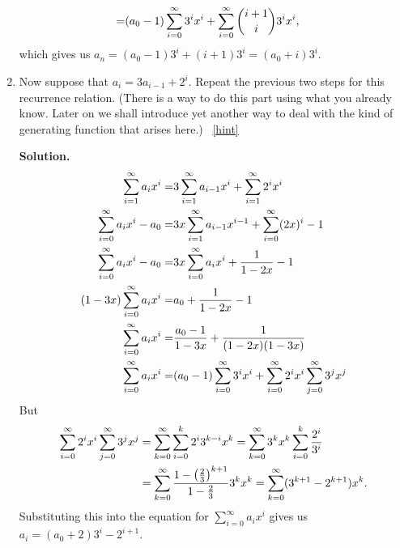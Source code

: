 \documentclass{book}
\begin{document}
\begin{activity}[]
\begin{enumerate}[font=\bfseries,label=(\alph*),ref=\alph*]
\begin{align*}
=& (a_0-1)\sum_{i=0}^\infty 3^ix^i +\sum_{i=0}^\infty \binom{i+1}{i}3^ix^i,
\end{align*}
which gives us \(a_n=(a_0-1) 3^i + (i+1)3^i=(a_0+i)3^i\).%
\item\label{task-249} \hypertarget{p-1406}{}%
Now suppose that \(a_i=3a_{i-1} + 2^i\).  Repeat the previous two steps for this recurrence relation.  (There is a way to do this part using what you already know.  Later on we shall introduce yet another way to deal with the kind of generating function that arises here.)%
~\hfill{\tiny\hyperlink{a-258.c}{[hint]}\hypertarget{q-258.c}{}}\par\smallskip%
\noindent\textbf{Solution.}\hypertarget{solution-196}{}\quad%
\hypertarget{p-1408}{}%
%
\begin{align*}
\sum_{i=1}^\infty a_ix^i =& 3\sum_{i=1}^\infty
a_{i-1}x^i +\sum_{i=1}^\infty 2^ix^i\\
\sum_{i=0}^\infty a_ix^i -a_0  =& 3x\sum_{i=1}^\infty a_{i-1}x^{i-1}
+\sum_{i=0}^\infty (2x)^i -1\\
\sum_{i=0}^\infty a_ix^i -a_0  =& 3x\sum_{i=0}^\infty a_ix^i +\frac{1}{1-2x} -1\\
(1-3x)\sum_{i=0}^\infty a_ix^i =& a_0 +\frac{1}{1-2x}-1\\
\sum_{i=0}^\infty a_ix^i =&  \frac{a_0-1}{1-3x}+\frac{1}{(1-2x)(1-3x)}\\
\sum_{i=0}^\infty a_ix^i =& (a_0-1)\sum_{i=0}^\infty 3^ix^i +\sum_{i=0}^\infty
2^ix^i\sum_{j=0}^\infty 3^jx^j
\end{align*}
But%
\begin{align*}
\sum_{i=0}^\infty
2^ix^i\sum_{j=0}^\infty 3^jx^j&=
\sum_{k=0}^\infty
\sum_{i=0}^k 2^i3^{k-i}x^k=
\sum_{k=0}^\infty3^kx^k
\sum_{i=0}^k \frac{2^i}{3^i}\\
&=\sum_{k=0}^\infty \frac{1-\left(\frac{2}{3}\right)^{k+1}}{1-\frac{2}{3}}3^kx^k =\sum_{k=0}^\infty
(3^{k+1}-2^{k+1})x^k\text{.}
\end{align*}
Substituting this into the equation for \(\sum_{i=0}^\infty a_ix^i\) gives us \(a_i =(a_0+2)3^i -2^{i+1}\).%
\end{enumerate}
\end{activity}
\end{document}
